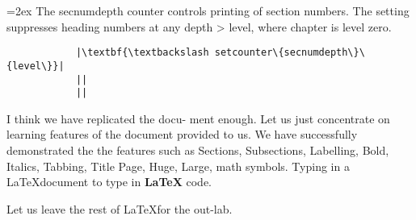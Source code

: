 \documentclass[12pt]{article}
\newcommand{\latex}{\LaTeX\xspace}
\begin{document}
\font=2ex
The secnumdepth counter controls printing of section numbers. The setting suppresses heading numbers at any depth > level, where chapter is
level zero.

\begin{lstlisting}
            |\textbf{\textbackslash setcounter\{secnumdepth\}\{level\}}|
            ||
            ||
\end{lstlisting}

{\huge I think we have replicated the docu-
ment enough. Let us just concentrate
on learning features of the document
provided to us. We have successfully
demonstrated the the features such as
Sections, Subsections, Labelling, Bold,
Italics, Tabbing, Title Page, Huge, Large,
math symbols. Typing in a {\latex}document
to type in \textbf{LaTeX} code.\\}

Let us leave the rest of {\latex}for the out-lab.
\end{document}
